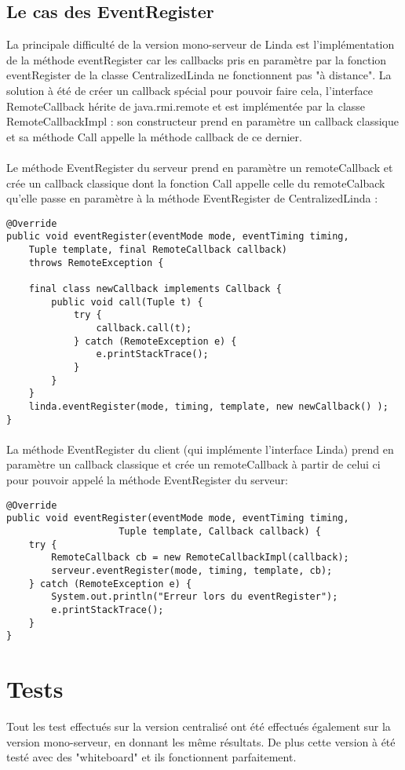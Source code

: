 \documentclass{report}
\begin{document}
\subsection{Le cas des EventRegister}
La principale difficulté de la version mono-serveur de Linda est l'implémentation de la méthode eventRegister car les callbacks pris en paramètre par la fonction eventRegister de la classe CentralizedLinda ne fonctionnent pas "à distance".
La solution à été de créer un callback spécial pour pouvoir faire cela, l'interface RemoteCallback hérite de java.rmi.remote et est implémentée par la classe RemoteCallbackImpl : son constructeur prend en paramètre un callback classique et sa méthode Call appelle la méthode callback de ce dernier.
\paragraph{}Le méthode EventRegister du serveur prend en paramètre un remoteCallback et crée un callback classique dont la fonction Call appelle celle du remoteCalback qu'elle passe en paramètre à la méthode EventRegister de CentralizedLinda : 
\begin{lstlisting}
@Override
public void eventRegister(eventMode mode, eventTiming timing,
	Tuple template, final RemoteCallback callback) 
	throws RemoteException {
	
	final class newCallback implements Callback {
		public void call(Tuple t) {
			try {
				callback.call(t);
			} catch (RemoteException e) {
				e.printStackTrace();
			}
		}
	}	
	linda.eventRegister(mode, timing, template, new newCallback() );
}
\end{lstlisting}
\paragraph{}La méthode EventRegister du client (qui implémente l'interface Linda) prend en paramètre un callback classique et crée un remoteCallback à partir de celui ci pour pouvoir appelé la méthode EventRegister du serveur:
\begin{lstlisting}
@Override
public void eventRegister(eventMode mode, eventTiming timing, 
					Tuple template, Callback callback) {
	try {
		RemoteCallback cb = new RemoteCallbackImpl(callback);
		serveur.eventRegister(mode, timing, template, cb);
	} catch (RemoteException e) {
		System.out.println("Erreur lors du eventRegister");
		e.printStackTrace();
	}
}
\end{lstlisting}
\section{Tests}
Tout les test effectués sur la version centralisé ont été effectués également sur la version mono-serveur, en donnant les même résultats.\newline
De plus cette version à été testé avec des "whiteboard" et ils fonctionnent parfaitement.
\end{document}
